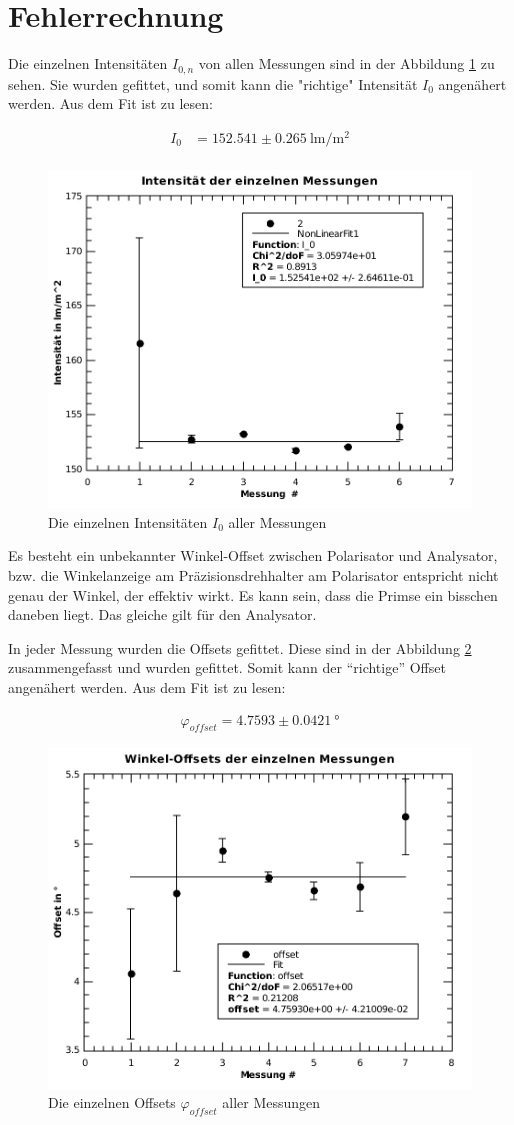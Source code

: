 \section{Fehlerrechnung}

Die einzelnen Intensit\"aten $I_{0,n}$ von allen Messungen sind in der Abbildung
\ref{fig:intensitaet_fit}  zu sehen. Sie wurden gefittet,  und  somit  kann  die
"richtige" Intensit\"at $I_0$  angen\"ahert  werden.  Aus  dem Fit ist zu lesen:

\begin{align*}
    I_0 &= 152.541 \pm 0.265\SI{}{\lumen\per\square\meter} \\
\end{align*}

\begin{figure}[H]
    \centering
    \includegraphics[width=.5\linewidth]{images/intensitaet_fit.pdf}
    \caption{Die einzelnen Intensit\"aten $I_0$ aller Messungen}
    \label{fig:intensitaet_fit}
\end{figure}

Es besteht  ein  unbekannter  Winkel-Offset zwischen Polarisator und Analysator,
bzw. die Winkelanzeige am Pr\"azisionsdrehhalter am Polarisator entspricht nicht
genau der Winkel, der effektiv wirkt. Es kann sein, dass die Primse ein bisschen
daneben liegt. Das gleiche gilt f\"ur den Analysator.

In jeder  Messung  wurden  die  Offsets  gefittet.  Diese  sind in der Abbildung
\ref{fig:offset_fit}  zusammengefasst   und  wurden  gefittet.  Somit  kann  der
``richtige''  Offset  angen\"ahert   werden.   Aus   dem   Fit   ist  zu  lesen:

\begin{align*}
    \varphi_{offset} = 4.7593 \pm 0.0421\SI{}{\degree}
\end{align*}

\begin{figure}[H]
    \centering
    \includegraphics[width=.5\linewidth]{images/offset_fit.pdf}
    \caption{Die einzelnen Offsets $\varphi_{offset}$ aller Messungen}
    \label{fig:offset_fit}
\end{figure}

